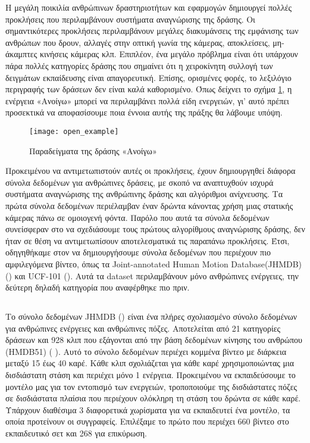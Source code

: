 Η μεγάλη ποικιλία ανθρώπινων δραστηριοτήτων και εφαρμογών δημιουργεί πολλές προκλήσεις που περιλαμβάνουν συστήματα αναγνώρισης της δράσης.
Οι σημαντικότερες προκλήσεις περιλαμβάνουν μεγάλες διακυμάνσεις της εμφάνισης των ανθρώπων που δρουν, αλλαγές στην οπτική γωνία της κάμερας, αποκλείσεις,
μη-άκαμπτες κινήσεις κάμερας κλπ. Επιπλέον, ένα μεγάλο πρόβλημα είναι ότι υπάρχουν πάρα πολλές κατηγορίες δράσης που σημαίνει
ότι η χειροκίνητη συλλογή των δειγμάτων εκπαίδευσης είναι απαγορευτική. Επίσης, ορισμένες φορές, το λεξιλόγιο περιγραφής των δράσεων δεν είναι καλά καθορισμένο.
Όπως δείχνει το σχήμα \ref{fig:open_example}, η ενέργεια «Ανοίγω» μπορεί να περιλαμβάνει πολλά είδη ενεργειών, γι' αυτό πρέπει προσεκτικά
να αποφασίσουμε ποια έννοια αυτής της πράξης θα λάβουμε υπόψη.

\begin{figure}[h]
  \centering
  \texttt{[image: open\_example]}
  \caption{Παραδείγματα της δράσης «Ανοίγω»}
  \label{fig:open_example}

\end{figure}

Προκειμένου να αντιμετωπιστούν αυτές οι προκλήσεις, έχουν δημιουργηθεί διάφορα σύνολα δεδομένων για ανθρώπινες δράσεις, με σκοπό να αναπτυχθούν
ισχυρά συστήματα αναγνώρισης της ανθρώπινης δράσης και αλγόριθμοι ανίχνευσης.
Τα πρώτα σύνολα δεδομένων περιέλαμβαν έναν δρώντα κάνοντας χρήση μιας στατικής κάμερας πάνω σε ομοιογενή φόντα.
Παρόλο που αυτά τα σύνολα δεδομένων συνείσφεραν στο να σχεδιάσουμε τους πρώτους αλγορίθμους αναγνώρισης δράσης, δεν ήταν σε θέση να αντιμετωπίσουν αποτελεσματικά τις παραπάνω
προκλήσεις.
Έτσι,  οδηγηθήκαμε στον να δημιουργήσουμε σύνολα δεδομένων που περιέχουν πιο αμφιλεγόμενα βίντεο, όπως τα \en Joint-annotated Human Motion Database(JHMDB) (\cite{Jhuang:ICCV:2013}) \gr 
και \en UCF-101 (\cite{soomro2012ucf101})\gr. Αυτά τα \en dataset \gr περιλαμβάνουν μόνο ανθρώπινες ενέργειες, την δεύτερη δηλαδή κατηγορία που αναφέρθηκε πιο πριν.

\subsection{}
Το σύνολο δεδομένων \en JHMDB (\cite{Jhuang:ICCV:2013}) \gr είναι ένα πλήρες σχολιασμένο σύνολο δεδομένων για ανθρώπινες ενέργειες και ανθρώπινες πόζες. Αποτελείται από 21 κατηγορίες δράσεων
και 928 κλιπ που εξάγονται από την βάση δεδομένων κίνησης του ανθρώπου \en (HMDB51) ( \cite{Kuehne11})\gr. Αυτό το σύνολο δεδομένων περιέχει κομμένα βίντεο με διάρκεια μεταξύ
15 έως 40 καρέ. Κάθε κλιπ σχολιάζεται για κάθε καρέ χρησιμοποιώντας μια δισδιάστατη στάση και περιέχει μόνο 1 ενέργεια.
Προκειμένου να εκπαιδεύσουμε το μοντέλο μας για τον εντοπισμό των ενεργειών, τροποποιούμε της δισδιάστατες πόζες σε δισδιάστατα πλαίσια που περιέχουν ολόκληρη τη στάση του δρώντα σε κάθε καρέ.
Υπάρχουν διαθέσιμα 3 διαφορετικά χωρίσματα για να εκπαιδευτεί ένα μοντέλο, τα οποία προτείνουν οι συγγραφείς. Επιλέξαμε το πρώτο  που περιέχει 660
βίντεο στο εκπαιδευτικό σετ και 268 για επικύρωση.

